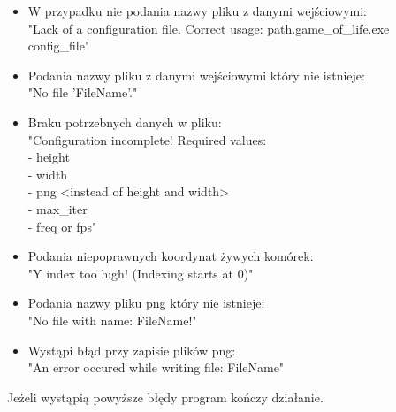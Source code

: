 \documentclass[12pt]{article}
\begin{document}
\begin{itemize}
	\item W przypadku nie podania nazwy pliku z danymi wejściowymi:\\
	      "Lack of a configuration file.
	      Correct usage: path.game\_of\_life.exe config\_file"

	\item Podania nazwy pliku z danymi wejściowymi który 
	nie istnieje:\\
	      "No file 'FileName'."

	\item Braku potrzebnych danych w pliku:\\
	      "Configuration incomplete! Required values:\\
	      - height\\
	      - width\\
	      - png \textless{}instead of height and width\textgreater{}\\
	      - max\_iter\\
	      - freq or fps"
	
	\item Podania niepoprawnych koordynat żywych komórek:\\
	      "Y index too high! (Indexing starts at 0)"
	      
	\item Podania nazwy pliku png który nie istnieje:\\
		  "No file with name: FileName!"
		  
	\item Wystąpi błąd przy zapisie plików png:\\
		  "An error occured while writing file: FileName"

\end{itemize}
Jeżeli wystąpią powyższe błędy program kończy działanie.
\end{document}
